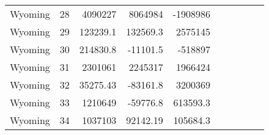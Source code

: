 \begin{landscape}
\begin{singlespace}
\begin{longtable}{lrrrr|lrrrr}
		Wyoming &  28 & 4090227 & 8064984 & -1908986 &&&&& \\
		Wyoming &  29 & 123239.1 & 132569.3 & 2575145 &&&&& \\
		Wyoming &  30 & 214830.8 & -11101.5 & -518897 &&&&& \\
		Wyoming &  31 & 2301061 & 2245317 & 1966424 &&&&& \\
		Wyoming &  32 & 35275.43 & -83161.8 & 3200369 &&&&& \\
		Wyoming &  33 & 1210649 & -59776.8 & 613593.3 &&&&& \\
		Wyoming &  34 & 1037103 & 92142.19 & 105684.3
	\end{longtable}
\end{singlespace}
\end{landscape}
